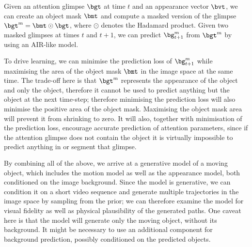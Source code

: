     Given an attention glimpse $\bgt$ at time $t$ and an appearance vector $\bvt$, we can create an object mask $\bmt$ and compute a masked version of the glimpse $\bgt^m = \bmt \odot \bgt$, where $\odot$ denotes the Hadamard product. Given two masked glimpses at times $t$ and $t+1$, we can predict $\bg_{t+1}^m$ from $\bgt^m$ by using an AIR-like model.
    
    To drive learning, we can minimise the prediction loss of $\bg_{t+1}^m$ while maximising the area of the object mask $\bmt$ in the image space at the same time. The trade-off here is that $\bgt^m$ represents the appearance of the object and only the object, therefore it cannot be used to predict anything but the object at the next time-step; therefore minimising the prediction loss will also minimise the positive area of the object mask. Maximising the object mask area will prevent it from shrinking to zero. It will also, together with minimisation of the prediction loss, encourage accurate prediction of attention parameters, since if the attention glimpse does not contain the object it is virtually impossible to predict anything in or segment that glimpse.
    
    By combining all of the above, we arrive at a generative model of a moving object, which includes the motion model as well as the appearance model, both conditioned on the image background. Since the model is generative, we can condition it on a short video sequence and generate multiple trajectories in the image space by sampling from the prior; we can therefore examine the model for visual fidelity as well as physical plausibility of the generated paths. One caveat here is that the model will generate only the moving object, without its background. It might be necessary to use an additional component for background prediction, possibly conditioned on the predicted objects.
  
  

